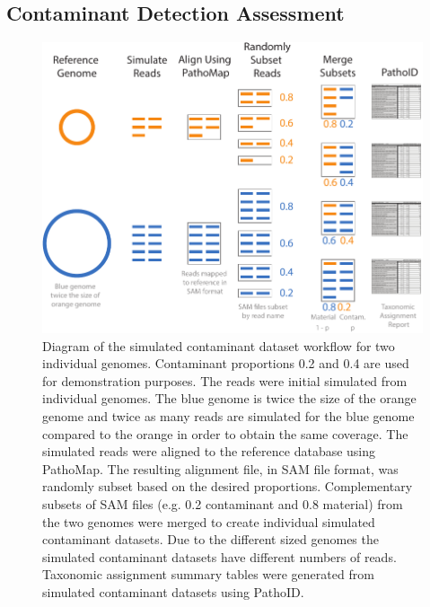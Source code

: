\documentclass[fleqn,10pt,lineno]{wlpeerj}\usepackage[]{graphicx}\usepackage[]{color}
\makeatletter
\def\maxwidth{ %
  \ifdim\Gin@nat@width>\linewidth
    \linewidth
  \else
    \Gin@nat@width
  \fi
}
\newenvironment{knitrout}{}{} %
\makeatother
\begin{document}
\subsection*{Contaminant Detection Assessment} 

\begin{knitrout}
\color{fgcolor}\begin{figure}
\includegraphics[width=\maxwidth]{figure/contam_simulation} \caption[Diagram of the simulated contaminant dataset workflow for two individual genomes]{Diagram of the simulated contaminant dataset workflow for two individual genomes. Contaminant proportions 0.2 and 0.4 are used for demonstration purposes. The reads were initial simulated from individual genomes. The blue genome is twice the size of the orange genome and twice as many reads are simulated for the blue genome compared to the orange in order to obtain the same coverage. The simulated reads were aligned to the reference database using PathoMap. The resulting alignment file, in SAM file format, was randomly subset based on the desired proportions. Complementary subsets of SAM files (e.g. 0.2 contaminant and 0.8 material) from the two genomes were merged to create individual simulated contaminant datasets.  Due to the different sized genomes the simulated contaminant datasets have different numbers of reads. Taxonomic assignment summary tables were generated from simulated contaminant datasets using PathoID.}\label{fig:contam_simulation}
\end{figure}


\end{knitrout}
\end{document}
